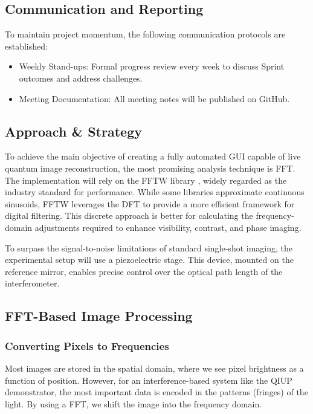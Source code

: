 \documentclass[12pt,a4paper]{article}
\begin{document}
\subsection{Communication and Reporting}
To maintain project momentum, the following communication protocols are established:
\begin{itemize}
    \item Weekly Stand-ups: Formal progress review every week to discuss Sprint outcomes and address challenges.
    \item Meeting Documentation: All meeting notes will be published on GitHub.
\end{itemize}


\subsection{Approach \& Strategy}
To achieve the main objective of creating a fully automated \ac{GUI} capable of live quantum image reconstruction, the most promising analysis technique is \ac{FFT}. The implementation will rely on the FFTW library \cite{frigo2005design}, widely regarded as the industry standard for performance.
While some libraries approximate continuous sinusoids, FFTW leverages the \ac{DFT} to provide a more efficient framework for digital filtering. This discrete approach is better for calculating the frequency-domain adjustments required to enhance visibility, contrast, and phase imaging.

To surpass the signal-to-noise limitations of standard single-shot imaging, the experimental setup will use a piezoelectric stage. This device, mounted on the reference mirror, enables precise control over the optical path length of the interferometer. 

\subsection{FFT-Based Image Processing}

\subsubsection*{Converting Pixels to Frequencies}

Most images are stored in the spatial domain, where we see pixel brightness as a function of position. However, for an interference-based system like the \ac{QIUP} demonstrator, the most important data is encoded in the patterns (fringes) of the light. By using a \ac{FFT}, we shift the image into the frequency domain.
\end{document}
